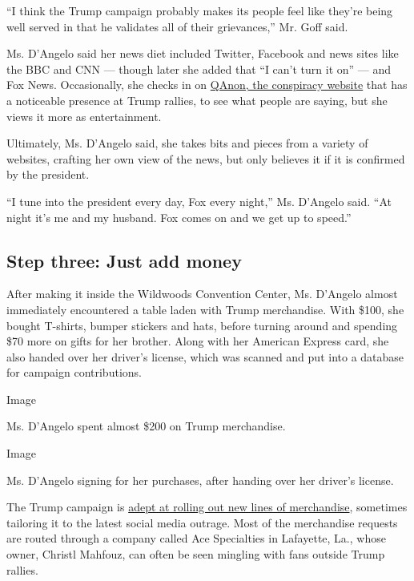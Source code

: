 ``I think the Trump campaign probably makes its people feel like they're
being well served in that he validates all of their grievances,'' Mr.
Goff said.

Ms. D'Angelo said her news diet included Twitter, Facebook and news
sites like the BBC and CNN --- though later she added that ``I can't
turn it on'' --- and Fox News. Occasionally, she checks in on
\href{https://www.nytimes3xbfgragh.onion/2020/02/09/us/politics/qanon-trump-conspiracy-theory.html}{QAnon,
the conspiracy website} that has a noticeable presence at Trump rallies,
to see what people are saying, but she views it more as entertainment.

Ultimately, Ms. D'Angelo said, she takes bits and pieces from a variety
of websites, crafting her own view of the news, but only believes it if
it is confirmed by the president.

``I tune into the president every day, Fox every night,'' Ms. D'Angelo
said. ``At night it's me and my husband. Fox comes on and we get up to
speed.''

\hypertarget{step-three-just-add-money}{%
\subsection{Step three: Just add
money}\label{step-three-just-add-money}}

After making it inside the Wildwoods Convention Center, Ms. D'Angelo
almost immediately encountered a table laden with Trump merchandise.
With \$100, she bought T-shirts, bumper stickers and hats, before
turning around and spending \$70 more on gifts for her brother. Along
with her American Express card, she also handed over her driver's
license, which was scanned and put into a database for campaign
contributions.

Image

Ms. D'Angelo spent almost \$200 on Trump merchandise.

Image

Ms. D'Angelo signing for her purchases, after handing over her driver's
license.

The Trump campaign is
\href{https://www.nytimes3xbfgragh.onion/2019/09/13/us/politics/donald-trump-2020-campaign.html}{adept
at rolling out new lines of merchandise}, sometimes tailoring it to the
latest social media outrage. Most of the merchandise requests are routed
through a company called Ace Specialties in Lafayette, La., whose owner,
Christl Mahfouz, can often be seen mingling with fans outside Trump
rallies.

